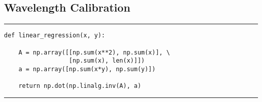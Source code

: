 \documentclass[preprint]{aastex62}
\begin{document}
\subsection{Wavelength Calibration} \label{code:stats}
\small
\hrule
\begin{lstlisting}
def linear_regression(x, y):
    
    A = np.array([[np.sum(x**2), np.sum(x)], \
                  [np.sum(x), len(x)]])
    a = np.array([np.sum(x*y), np.sum(y)])

    return np.dot(np.linalg.inv(A), a)
\end{lstlisting}
\hrule \vspace{7pt}
\end{document}
